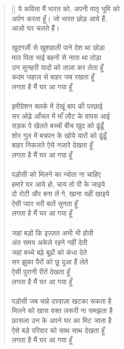 \begin{verse}[\versewidth]\texthindi{
ये कविता मैं भारत को, अपनी मातृ भूमि को\\
अर्पण करता हूँ। जो भारत छोड़ आये हैं,\\
आओ घर चलते हैं।\\
\\
खुदगर्ज़ी से खुशहाली पाने देश था छोड़ा\\
मात पिता भाई बहनों से नाता था तोड़ा\\
उन सुनहरी यादों को ताज़ा कर लेता हूँ\\
कदम जहाज़ से बाहर जब रखता हूँ\\
लगता है मैं घर आ गया हूँ\\
\\
इमीग्रेशन क्लर्क में देखूं बाप की परछाई\\
सर ओढ़े आँचल में माँ लौट के वापस आई\\
सड़क पे खेलते बच्चों बीच खुद को ढूंढूँ\\
शोर गुल में बचपन के खोये यारों को ढूंढूँ\\
बाहर निकलते ऐसे नज़ारे देखता हूँ\\
लगता है मैं घर आ गया हूँ\\
\\
पड़ोसी को मिलने का न्योता ना चाहिए\\
हमारे घर आये हो, चाय तो पी के जाइये\\
दो रोटी और बना लें गे, खाना यहीं खाइये\\
ऐसी प्यार भरी बातें सुनता हूँ\\
लगता है मैं घर आ गया हूँ\\
\\
जहां बड़ों कि इज़्ज़त अभी भी होती\\
अंत समय अकेले रहने नहीं देती\\
जहां बच्चे बढ़े बूढ़ों को कंधा देते\\
सर झुका पैरों को छू दुआ हैं लेते\\
ऐसी पुरानी रीतें देखता हूँ\\
लगता है मैं घर आ गया हूँ\\
\\
पड़ोसी जब चाहे दरवाज़ा खटका सकता है\\
मिलने को खास वक्त ज़रूरी ना समझता है\\
फ़ासला उन के अपने घर का मिट जाता है\\
ऐसे बड़े परिवार को साथ साथ देखता हूँ\\
लगता है मैं घर आ गया हूँ\\
}
\end{verse}
